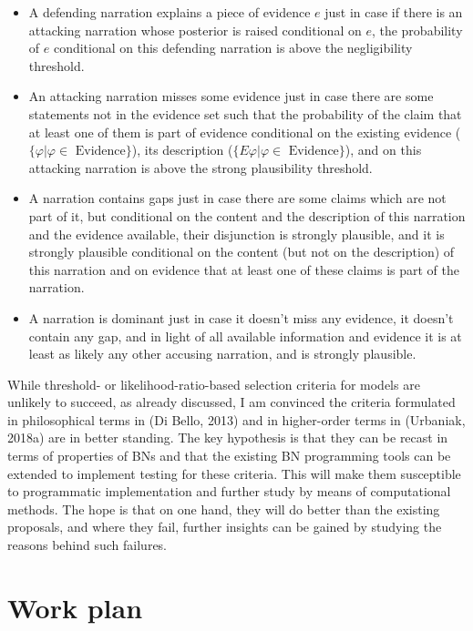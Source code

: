\documentclass[11pt,dvipsnames,enabledeprecatedfontcommands]{scrartcl}
\begin{document}
\begin{itemize}\setlength\itemsep{-1mm}
 \item A defending narration explains  a piece of evidence  $e$ just in case  if there is an  attacking narration whose posterior is raised conditional on $e$, the probability of $e$ conditional on this defending narration is above the negligibility threshold.
 \item An attacking narration misses some evidence just in case there are some statements not in the evidence set such that the probability of the claim that at least one of them is part of evidence conditional on the existing evidence ($\{\varphi\vert \varphi \in \mbox{ Evidence}\}$), its description ($\{E\varphi\vert \varphi \in \mbox{ Evidence}\}$), and on this attacking narration is above the strong plausibility threshold. 
 \item A narration contains gaps just in case there are some claims which are not part of it, but conditional on the content and the description of this narration and the evidence available, their disjunction is strongly plausible, and it is strongly plausible conditional on the content (but not on the description) of this narration and on evidence that at least one of these claims is part of the narration.
 \item  A narration is dominant just in case it doesn't miss any evidence, it doesn’t contain any gap, and in light of all available information and evidence it is at least as likely any other accusing narration, and is strongly plausible.
 \end{itemize}

While threshold- or likelihood-ratio-based selection criteria for models
are unlikely to succeed, as already discussed, I am convinced the
criteria formulated in philosophical terms in (Di Bello, 2013) and in
higher-order terms in (Urbaniak, 2018a) are in better standing. The key
hypothesis is that they can be recast in terms of properties of BNs and
that the existing BN programming tools can be extended to implement
testing for these criteria. This will make them susceptible to
programmatic implementation and further study by means of computational
methods. The hope is that on one hand, they will do better than the
existing proposals, and where they fail, further insights can be gained
by studying the reasons behind such failures.

\section{Work plan}\label{work-plan}
\end{document}
